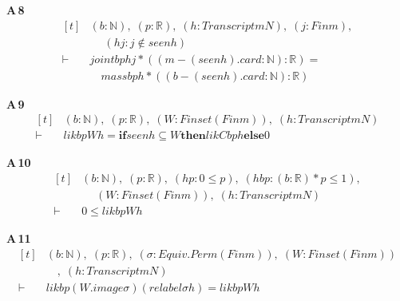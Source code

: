 \noindent\textbf{A\,8}\quad{}
{\footnotesize\[ \begin{aligned}[t]
&(\mathit{b} : \mathbb{N} ),\; (\mathit{p} : \mathbb{R} ),\; (\mathit{h} : \mathit{Transcript} \mathit{m} \mathit{N}),\; (\mathit{j} : \mathit{Fin} \mathit{m}),\\
&\quad \; (\mathit{hj} : \mathit{j} \notin \mathit{seen} \mathit{h})\\
\vdash\;&\mathit{joint} \mathit{b} \mathit{p} \mathit{h} \mathit{j} * ((\mathit{m} - (\mathit{seen} \mathit{h}).\mathit{card} : \mathbb{N} ) : \mathbb{R} ) =\\
&\quad \mathit{mass} \mathit{b} \mathit{p} \mathit{h} * ((\mathit{b} - (\mathit{seen} \mathit{h}).\mathit{card} : \mathbb{N} ) : \mathbb{R} )
\end{aligned} \]}

\noindent\textbf{A\,9}\quad{}
{\footnotesize\[ \begin{aligned}[t]
&(\mathit{b} : \mathbb{N} ),\; (\mathit{p} : \mathbb{R} ),\; (\mathit{W} : \mathit{Finset} (\mathit{Fin} \mathit{m})),\; (\mathit{h} : \mathit{Transcript} \mathit{m} \mathit{N})\\
\vdash\;&\mathit{lik} \mathit{b} \mathit{p} \mathit{W} \mathit{h} = \mathbf{if} \mathit{seen} \mathit{h} \subseteq \mathit{W} \mathbf{then} \mathit{likC} \mathit{b} \mathit{p} \mathit{h} \mathbf{else} 0
\end{aligned} \]}

\noindent\textbf{A\,10}\quad{}
{\footnotesize\[ \begin{aligned}[t]
&(\mathit{b} : \mathbb{N} ),\; (\mathit{p} : \mathbb{R} ),\; (\mathit{hp} : 0 \leq \mathit{p}),\; (\mathit{hbp} : (\mathit{b} : \mathbb{R} ) * \mathit{p} \leq 1),\\
&\quad \; (\mathit{W} : \mathit{Finset} (\mathit{Fin} \mathit{m})),\; (\mathit{h} : \mathit{Transcript} \mathit{m} \mathit{N})\\
\vdash\;&0 \leq \mathit{lik} \mathit{b} \mathit{p} \mathit{W} \mathit{h}
\end{aligned} \]}

\noindent\textbf{A\,11}\quad{}
{\footnotesize\[ \begin{aligned}[t]
&(\mathit{b} : \mathbb{N} ),\; (\mathit{p} : \mathbb{R} ),\; (\sigma : \mathit{Equiv}.\mathit{Perm} (\mathit{Fin} \mathit{m})),\; (\mathit{W} : \mathit{Finset} (\mathit{Fin} \mathit{m}))\\
&\quad ,\; (\mathit{h} : \mathit{Transcript} \mathit{m} \mathit{N})\\
\vdash\;&\mathit{lik} \mathit{b} \mathit{p} (\mathit{W}.\mathit{image} \sigma ) (\mathit{relabel} \sigma \mathit{h}) = \mathit{lik} \mathit{b} \mathit{p} \mathit{W} \mathit{h}
\end{aligned} \]}


